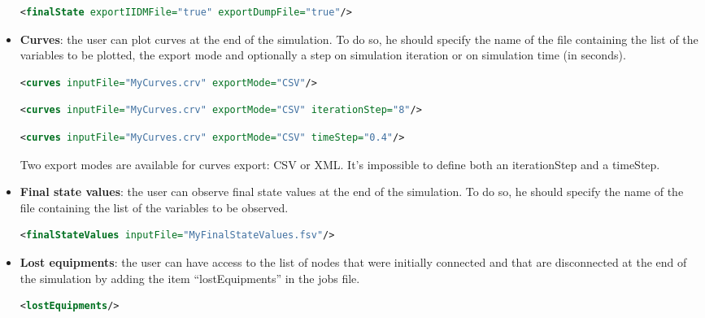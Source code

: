 \documentclass[a4paper, 12pt]{report}
\begin{document}
\begin{itemize}
\begin{lstlisting}[language=XML, morekeywords={finalState},numbers=none]
<finalState exportIIDMFile="true" exportDumpFile="true"/>
\end{lstlisting}

\item \textbf{Curves}: the user can plot curves at the end of the simulation. To do so, he should specify the name of the file containing the list of the variables to be plotted, the export mode and optionally a step on simulation iteration or on simulation time (in seconds).

\begin{lstlisting}[language=XML, morekeywords={curves},numbers=none]
<curves inputFile="MyCurves.crv" exportMode="CSV"/>
\end{lstlisting}

\begin{lstlisting}[language=XML, morekeywords={curves},numbers=none]
<curves inputFile="MyCurves.crv" exportMode="CSV" iterationStep="8"/>
\end{lstlisting}

\begin{lstlisting}[language=XML, morekeywords={curves},numbers=none]
<curves inputFile="MyCurves.crv" exportMode="CSV" timeStep="0.4"/>
\end{lstlisting}

Two export modes are available for curves export: CSV or XML.
It's impossible to define both an iterationStep and a timeStep.

\item \textbf{Final state values}: the user can observe final state values at the end of the simulation. To do so, he should specify the name of the file containing the list of the variables to be observed.

\begin{lstlisting}[language=XML, morekeywords={finalStateValues},numbers=none]
<finalStateValues inputFile="MyFinalStateValues.fsv"/>
\end{lstlisting}

\item \textbf{Lost equipments}:  the user can have access to the list of nodes that were initially connected and that are disconnected at the end of the simulation by adding the item ``lostEquipments'' in the jobs file.

\begin{lstlisting}[language=XML, morekeywords={lostEquipments},numbers=none]
<lostEquipments/>
\end{lstlisting}


\end{itemize}
\end{document}
